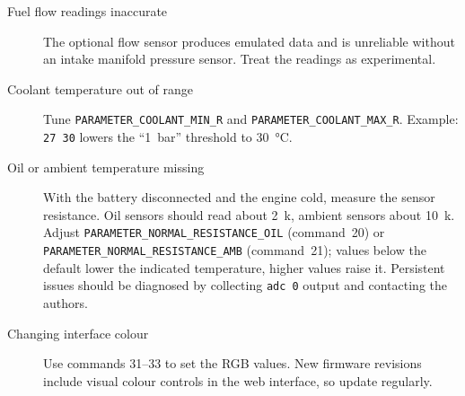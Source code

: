 \begin{description}
    \item[Fuel flow readings inaccurate] The optional flow sensor produces emulated data and is unreliable without an intake manifold pressure sensor. Treat the readings as experimental.
    \item[Coolant temperature out of range] Tune \texttt{PARAMETER\_COOLANT\_MIN\_R} and \texttt{PARAMETER\_COOLANT\_MAX\_R}. Example: \verb|27 30| lowers the ``1~bar'' threshold to \SI{30}{\celsius}.
    \item[Oil or ambient temperature missing] With the battery disconnected and the engine cold, measure the sensor resistance. Oil sensors should read about 2~k\ohm{}, ambient sensors about 10~k\ohm{}. Adjust \texttt{PARAMETER\_NORMAL\_RESISTANCE\_OIL} (command~20) or \texttt{PARAMETER\_NORMAL\_RESISTANCE\_AMB} (command~21); values below the default lower the indicated temperature, higher values raise it. Persistent issues should be diagnosed by collecting \verb|adc 0| output and contacting the authors.
    \item[Changing interface colour] Use commands 31--33 to set the RGB values. New firmware revisions include visual colour controls in the web interface, so update regularly.
\end{description}
